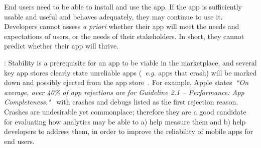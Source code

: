 End users need to be able to install and use the app. If the app is sufficiently usable and useful and behaves adequately, they may continue to use it. Developers cannot assess \emph{a priori} whether their app will meet the needs and expectations of users, or the needs of their stakeholders.
In short, they cannot predict whether their app will thrive.

: Stability is a prerequisite for an app to be viable in the marketplace, and several key app stores clearly state unreliable apps (~\emph{e.g.} apps that crash) will be marked down and possibly ejected from the app store~. For example, Apple states~\emph{``On average, over 40\% of app rejections are for Guideline 2.1 – Performance: App Completeness."}~ with crashes and debugs listed as the first rejection reason. %
Crashes are undesirable yet commonplace; therefore they are a good candidate for evaluating how analytics may be able to a) help measure them and b) help developers to address them, in order to improve the reliability of mobile apps for end users.

